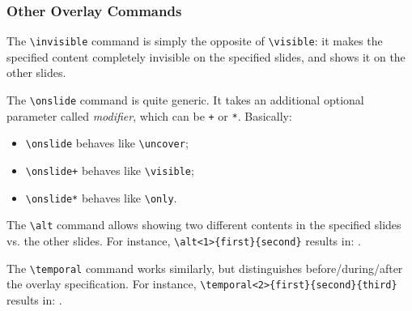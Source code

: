 \documentclass[10pt,    %
    english,            %
    xcolor=table,       %
    envcountsect,       %
    aspectratio=43      %
]{beamer}
\begin{document}
\begin{frame}
    \frametitle{Other Overlay Commands}
    
    The \texttt{\textbackslash{}invisible} command is simply the opposite of \texttt{\textbackslash{}visible}: it makes the specified content completely invisible on the specified slides, and shows it on the other slides.
    
    \medskip
    The \texttt{\textbackslash{}onslide} command is quite generic. It takes an additional optional parameter called \textit{modifier}, which can be \texttt{+} or \texttt{*}. Basically:
    \begin{itemize}
        \item<1-> \texttt{\textbackslash{}onslide} behaves like \texttt{\textbackslash{}uncover};
        \item<2-> \texttt{\textbackslash{}onslide+} behaves like \texttt{\textbackslash{}visible};
        \item<3-> \texttt{\textbackslash{}onslide*} behaves like \texttt{\textbackslash{}only}. 
    \end{itemize}
    
    \medskip
    The \texttt{\textbackslash{}alt} command allows showing two different contents in the specified slides vs. the other slides. For instance, \texttt{\textbackslash{}alt<1>\{first\}\{second\}} results in: .
    
    \medskip
    The \texttt{\textbackslash{}temporal} command works similarly, but distinguishes before/during/after the overlay specification. For instance, \texttt{\textbackslash{}temporal<2>\{first\}\{second\}\{third\}} results in: .
\end{frame}




\end{document}
